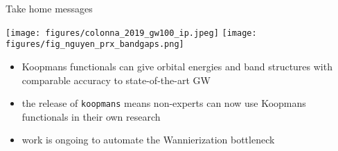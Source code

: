 \documentclass[xcolor=table,aspectratio=169]{beamer}
\newcommand\blfootcite[1]{%
  \begingroup
  \renewcommand\thefootnote{}\footnote{\hspace{-4ex}\cite{#1}}%
  \addtocounter{footnote}{-1}%
  \endgroup
}
\numberwithin{equation}{section}
\begin{document}
% 
% 
% 
% 
% 

\begin{frame}{Take home messages}

   \texttt{[image: figures/colonna\_2019\_gw100\_ip.jpeg]}
   \hfill
   \texttt{[image: figures/fig\_nguyen\_prx\_bandgaps.png]}
   \hfill

   \begin{itemize}
      \item Koopmans functionals can give orbital energies and band structures with comparable accuracy to state-of-the-art GW
      \item the release of \texttt{koopmans} means non-experts can now use Koopmans functionals in their own research
      \item work is ongoing to automate the Wannierization bottleneck
   \end{itemize}

\end{frame}
\end{document}

